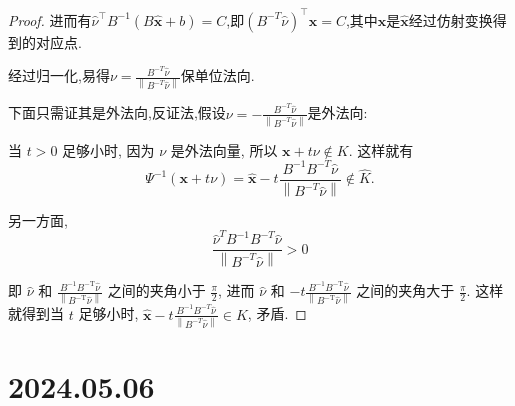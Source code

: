 \documentclass[12pt,a4paper]{article}
\begin{document}
\begin{enumerate}
\begin{proof}
			进而有$\widehat{\nu}^\top B^{-1} (B\widehat{\boldsymbol{x}}+b)=C$,即$(B^{-T} \widehat{\nu})^\top \boldsymbol{x}=C$,其中$\boldsymbol{x}$是$\widehat{\boldsymbol{x}}$经过仿射变换得到的对应点.
			
			经过归一化,易得$
			\nu=\frac{B^{-T} \widehat{\nu}}{\left\|B^{-T} \widehat{\nu}\right\|}
			$保单位法向.
			
			下面只需证其是外法向,反证法,假设$
			\nu=-\frac{B^{-T} \widehat{\nu}}{\left\|B^{-T} \widehat{\nu}\right\|}
			$是外法向:
			
			当 $t>0$ 足够小时, 因为 $\nu$ 是外法向量, 所以 $\boldsymbol{x}+t \nu \notin K$. 这样就有
			$$
			\Psi^{-1}(\boldsymbol{x}+t \nu)=\widehat{\boldsymbol{x}}-t \frac{B^{-1} B^{-{T}} \widehat{\nu}}{\left\|B^{-{T}} \widehat{\nu}\right\|} \notin \hat{K} .
			$$
			
			另一方面,
			$$
			\frac{\hat{\nu}^{{T}} {B}^{-1} {B}^{-{T}} \widehat{{\nu}}}{\left\|{B}^{-{T}} \widehat{{\nu}}\right\|}>0
			$$
			
			即 $\hat{\nu}$ 和 $\frac{B^{-1} B^{-\mathrm{T}} \hat{\nu}}{\left\|B^{-\mathrm{T}} \hat{\nu}\right\|}$ 之间的夹角小于 $\frac{\pi}{2}$, 进而 $\hat{\nu}$ 和 $-t \frac{B^{-1} B^{-\mathrm{T}} \hat{\nu}}{\left\|B^{-\mathrm{T}} \hat{\nu}\right\|}$ 之间的夹角大于 $\frac{\pi}{2}$. 这样就得到当 $t$ 足够小时, $\hat{\boldsymbol{x}}-t \frac{{B}^{-1} {B}^{-{T}} \hat{{\nu}}}{\left\|{B}^{-{T}} \hat{{\nu}}\right\|} \in K$, 矛盾.
		\end{proof}
	\end{enumerate}
	
	\newpage
	
	\section*{2024.05.06}	
	
\end{document}
